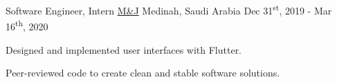 \begin{cventries}
    \cventry
    {Software Engineer, Intern}
    {\href{https://x.com/MJTec2}{M\&J}}
    {Medinah, Saudi Arabia}
    {Dec 31\textsuperscript{st}, 2019 - Mar 16\textsuperscript{th}, 2020}
    {
        \begin{cvitems}
            \item {Designed and implemented user interfaces with Flutter.}
            \item {Peer-reviewed code to create clean and stable software solutions.}
        \end{cvitems}
    }

\end{cventries}
\endgroup
